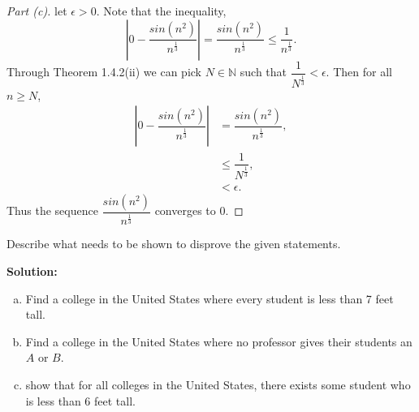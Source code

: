 \documentclass[12pt]{article}
\makeatletter
\theoremstyle{homework}
\newenvironment{exercise}[1]
{\def\@currentlabel{#1}\exercisecore}
{\endexercisecore}
\newcommand{\localhead}[1]{\par\smallskip\noindent\textbf{#1}\nobreak\\}%
\newcommand\solution{\localhead{Solution:}}
\newcommand{\Nats}{\ensuremath{\mathbb N}}
\makeatother
\begin{document}
\begin{proof}[Part (c)]let $\epsilon > 0$. Note that the inequality,
	\begin{equation*}
		|0 - \dfrac{sin(n^2)}{n^\frac{1}{3}}| = \dfrac{sin(n^2)}{n^\frac{1}{3}} \le \dfrac{1}{n^\frac{1}{3}}. 
	\end{equation*}
	Through Theorem 1.4.2(ii) we can pick $N \in \Nats$ such that $\dfrac{1}{N^\frac{1}{3}}<\epsilon$. Then for all $n \geq N$,
	\begin{align*}
		|0 - \dfrac{sin(n^2)}{n^\frac{1}{3}}| &= \dfrac{sin(n^2)}{n^\frac{1}{3}},\\
		&\le \dfrac{1}{N^\frac{1}{3}},\\
		&< \epsilon.
	\end{align*}
	Thus the sequence $\dfrac{sin(n^2)}{n^\frac{1}{3}}$ converges to $0$.  
\end{proof}











\begin{exercise}{2.2.3}
Describe what needs to be shown to disprove the given statements.
\end{exercise}
\solution
\begin{enumerate}[(a)]
\item Find a college in the United States where every student is less than 7 feet tall.
\item Find a college in the United States where no professor gives their students an $A$ or $B$.
\item show that for all colleges in the United States, there exists some student who is less than 6 feet tall.
\end{enumerate}
\end{document}
